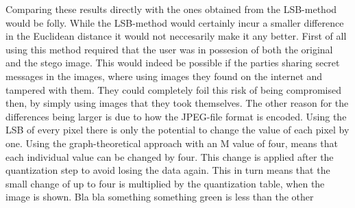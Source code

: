 Comparing these results directly with the ones obtained from the LSB-method would be folly.
While the LSB-method would certainly incur a smaller difference in the Euclidean distance it would not neccesarily make it any better.
First of all using this method required that the user was in possesion of both the original and the stego image.
This would indeed be possible if the parties sharing secret messages in the images, where using images they found on the internet and tampered with them.
They could completely foil this risk of being compromised then, by simply using images that they took themselves.
The other reason for the differences being larger is due to how the JPEG-file format is encoded.
Using the LSB of every pixel there is only the potential to change the value of each pixel by one.
Using the graph-theoretical approach with an M value of four, means that each individual value can be changed by four. 
This change is applied after the quantization step to avoid losing the data again.
This in turn means that the small change of up to four is multiplied by the quantization table, when the image is shown.
Bla bla something something green is less than the other